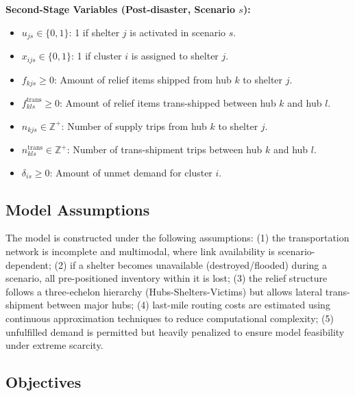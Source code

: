 \textbf{Second-Stage Variables (Post-disaster, Scenario $s$):}
\begin{itemize}
    \item $u_{js} \in \{0,1\}$: 1 if shelter $j$ is activated in scenario $s$.
    \item $x_{ijs} \in \{0,1\}$: 1 if cluster $i$ is assigned to shelter $j$.
    \item $f_{kjs} \ge 0$: Amount of relief items shipped from hub $k$ to shelter $j$.
    \item $f_{kls}^{\text{trans}} \ge 0$: Amount of relief items trans-shipped between hub $k$ and hub $l$.
    \item $n_{kjs} \in \mathbb{Z}^+$: Number of supply trips from hub $k$ to shelter $j$.
    \item $n_{kls}^{\text{trans}} \in \mathbb{Z}^+$: Number of trans-shipment trips between hub $k$ and hub $l$.
    \item $\delta_{is} \ge 0$: Amount of unmet demand for cluster $i$.
\end{itemize}

\subsection{Model Assumptions}
The model is constructed under the following assumptions: (1) the transportation network is incomplete and multimodal, where link availability is scenario-dependent; (2) if a shelter becomes unavailable (destroyed/flooded) during a scenario, all pre-positioned inventory within it is lost; (3) the relief structure follows a three-echelon hierarchy (Hubs-Shelters-Victims) but allows lateral trans-shipment between major hubs; (4) last-mile routing costs are estimated using continuous approximation techniques to reduce computational complexity; (5) unfulfilled demand is permitted but heavily penalized to ensure model feasibility under extreme scarcity.

\subsection{Objectives}

